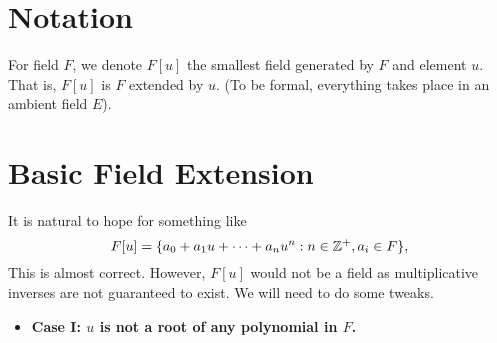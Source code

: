 \section{Notation}
For field $F$, we denote $F[u]$ the smallest field generated by $F$ and element $u$. That is, $F[u]$ is $F$ extended by $u$. (To be formal, everything takes place in an ambient field $E$).

\section{Basic Field Extension}
It is natural to hope for something like
\[
    F[u] = \{a_0 + a_1u + \dots + a_nu^n : n \in {\mathbb Z}^+, a_i \in F\},
\]
This is almost correct. However, $F[u]$ would not be a field as multiplicative inverses are not guaranteed to exist. We will need to do some tweaks.

\begin{itemize}
    \item \textbf{Case I: $u$ is not a root of any polynomial in $F$.}
\end{itemize}
